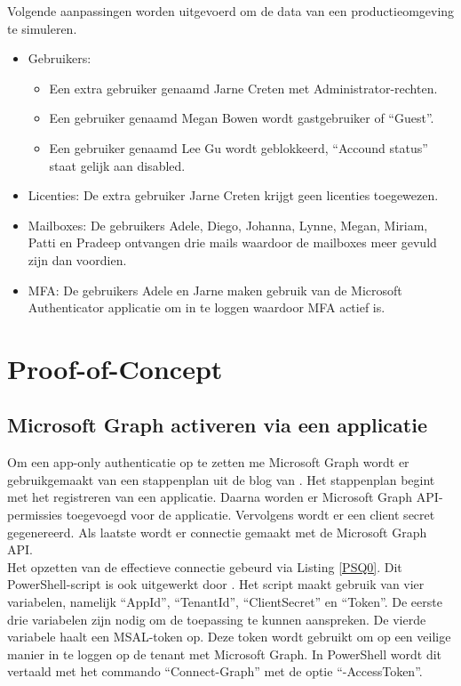 Volgende aanpassingen worden uitgevoerd om de data van een productieomgeving te simuleren.

\begin{itemize}
    \item Gebruikers: 
    \begin{itemize}
        \item Een extra gebruiker genaamd Jarne Creten met Administrator-rechten.
        \item Een gebruiker genaamd Megan Bowen wordt gastgebruiker of “Guest”.
        \item Een gebruiker genaamd Lee Gu wordt geblokkeerd, “Accound status” staat gelijk aan disabled.
    \end{itemize}
    \item Licenties: De extra gebruiker Jarne Creten krijgt geen licenties toegewezen.
    \item Mailboxes: De gebruikers Adele, Diego, Johanna, Lynne, Megan, Miriam, Patti en Pradeep ontvangen drie mails waardoor de mailboxes meer gevuld zijn dan voordien.
    \item \ac{MFA}: De gebruikers Adele en Jarne maken gebruik van de Microsoft Authenticator applicatie om in te loggen waardoor \ac{MFA} actief is.
\end{itemize}

\section{Proof-of-Concept}

\subsection{Microsoft Graph activeren via een applicatie}

Om een app-only authenticatie op te zetten me Microsoft Graph wordt er gebruikgemaakt van een stappenplan uit de blog van \textcite{Terlisten2022}. Het stappenplan begint met het registreren van een applicatie. Daarna worden er Microsoft Graph \Ac{API}-permissies toegevoegd voor de applicatie. Vervolgens wordt er een client secret gegenereerd. Als laatste wordt er connectie gemaakt met de Microsoft Graph \Ac{API}. \\

Het opzetten van de effectieve connectie gebeurd via Listing \ref{PSQ0}. Dit PowerShell-script is ook uitgewerkt door \textcite{Terlisten2022}. Het script maakt gebruik van vier variabelen, namelijk “AppId”, “TenantId”, “ClientSecret” en “Token”. De eerste drie variabelen zijn nodig om de toepassing te kunnen aanspreken. De vierde variabele haalt een \ac{MSAL}-token op. Deze token wordt gebruikt om op een veilige manier in te loggen op de tenant met Microsoft Graph. In PowerShell wordt dit vertaald met het commando “Connect-Graph” met de optie “-AccessToken”. \\

